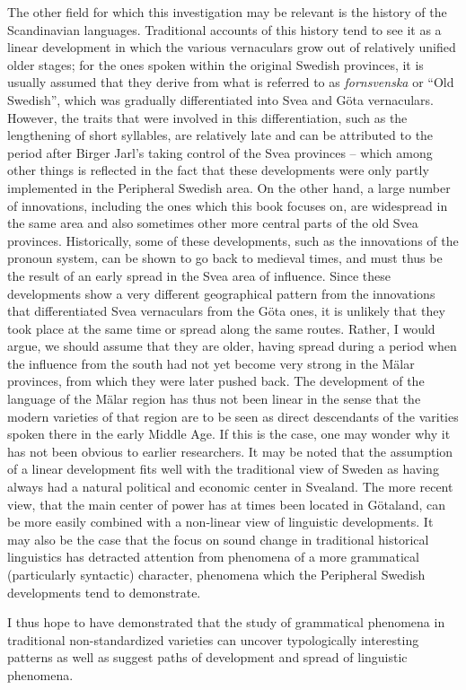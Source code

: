 The other field for which this investigation may be relevant is the history of the Scandinavian languages. Traditional accounts of this history tend to see it as a linear development in which the various vernaculars grow out of relatively unified older stages; for the ones spoken within the original Swedish provinces, it is usually assumed that they derive from what is referred to as \textit{fornsvenska} or “Old Swedish”, which was gradually differentiated into Svea and Göta vernaculars. However, the traits that were involved in this differentiation, such as the lengthening of short syllables, are relatively late and can be attributed to the period after Birger Jarl’s taking control of the Svea provinces – which among other things is reflected in the fact that these developments were only partly implemented in the Peripheral Swedish area. On the other hand, a large number of innovations, including the ones which this book focuses on, are widespread in the same area and also sometimes other more central parts of the old Svea provinces. Historically, some of these developments, such as the innovations of the pronoun system, can be shown to go back to medieval times, and must thus be the result of an early spread in the Svea area of influence. Since these developments show a very different geographical pattern from the innovations that differentiated Svea vernaculars from the Göta ones, it is unlikely that they took place at the same time or spread along the same routes. Rather, I would argue, we should assume that they are older, having spread during a period when the influence from the south had not yet become very strong in the Mälar provinces, from which they were later pushed back. The development of the language of the Mälar region has thus not been linear in the sense that the modern varieties of that region are to be seen as direct descendants of the varities spoken there in the early Middle Age. If this is the case, one may wonder why it has not been obvious to earlier researchers. It may be noted that the assumption of a linear development fits well with the traditional view of Sweden as having always had a natural political and economic center in Svealand. The more recent view, that the main center of power has at times been located in Götaland, can be more easily combined with a non-linear view of linguistic developments. It may also be the case that the focus on sound change in traditional historical linguistics has detracted attention from phenomena of a more grammatical (particularly syntactic) character, phenomena which the Peripheral Swedish developments tend to demonstrate.


I thus hope to have demonstrated that the study of grammatical phenomena in traditional non-standardized varieties can uncover typologically interesting patterns as well as suggest paths of development and spread of linguistic phenomena. 

